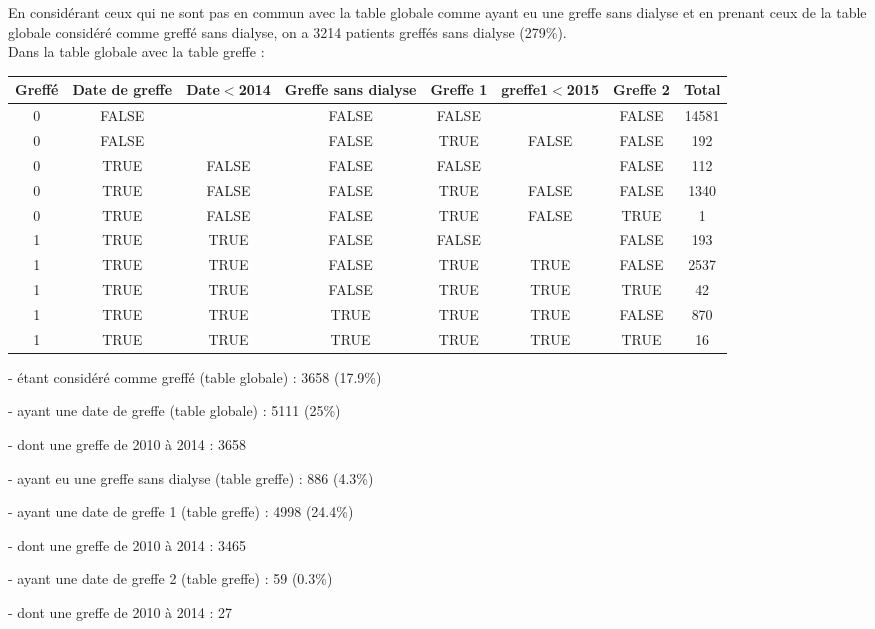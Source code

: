 \documentclass[11pt,a4paper]{article}\usepackage[]{graphicx}\usepackage[]{color}
\begin{document}
En considérant ceux qui ne sont pas en commun avec la table globale comme ayant eu une greffe sans dialyse et en prenant ceux de la table globale considéré comme greffé sans dialyse, on a 3214 patients greffés sans dialyse (279\%).
~\\

Dans la table globale avec la table greffe :

\begin{table}[H]
\centering
\begin{tabular}{cccccccc}
  \hline
Greffé & Date de greffe & Date$<$2014 & Greffe sans dialyse & Greffe 1 & greffe1$<$2015 & Greffe 2 & Total \\ 
  \hline
0 & FALSE &  & FALSE & FALSE &  & FALSE & 14581 \\ 
  0 & FALSE &  & FALSE & TRUE & FALSE & FALSE & 192 \\ 
  0 & TRUE & FALSE & FALSE & FALSE &  & FALSE & 112 \\ 
  0 & TRUE & FALSE & FALSE & TRUE & FALSE & FALSE & 1340 \\ 
  0 & TRUE & FALSE & FALSE & TRUE & FALSE & TRUE & 1 \\ 
  1 & TRUE & TRUE & FALSE & FALSE &  & FALSE & 193 \\ 
  1 & TRUE & TRUE & FALSE & TRUE & TRUE & FALSE & 2537 \\ 
  1 & TRUE & TRUE & FALSE & TRUE & TRUE & TRUE & 42 \\ 
  1 & TRUE & TRUE & TRUE & TRUE & TRUE & FALSE & 870 \\ 
  1 & TRUE & TRUE & TRUE & TRUE & TRUE & TRUE & 16 \\ 
   \hline
\end{tabular}
\end{table}


- étant considéré comme greffé (table globale) : 3658 (17.9\%)

- ayant une date de greffe (table globale) : 5111 (25\%)

\qquad - dont une greffe de 2010 à 2014 : 3658

- ayant eu une greffe sans dialyse (table greffe) : 886 (4.3\%)

- ayant une date de greffe 1 (table greffe) : 4998 (24.4\%)

\qquad - dont une greffe de 2010 à 2014 : 3465

- ayant une date de greffe 2 (table greffe) : 59 (0.3\%)

\qquad - dont une greffe de 2010 à 2014 : 27
\end{document}
